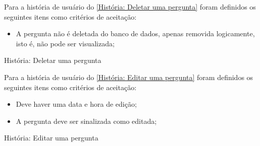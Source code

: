 Para a história de usuário do \autoref{História: Deletar uma pergunta} foram definidos os seguintes itens como critérios de aceitação:

\begin{itemize}
\item A pergunta não é deletada do banco de dados, apenas removida logicamente, isto é, não pode ser visualizada;
\end{itemize}

\def\arraystretch{2}
\begin{quadro}[htb]
\centering
\ABNTEXfontereduzida
\caption[História: Deletar uma pergunta]{História: Deletar uma pergunta}
\label{História: Deletar uma pergunta}
\end{quadro}
\FloatBarrier 

Para a história de usuário do \autoref{História: Editar uma pergunta} foram definidos os seguintes itens como critérios de aceitação:

\begin{itemize}
\item Deve haver uma data e hora de edição;
\item A pergunta deve ser sinalizada como editada;
\end{itemize}

\def\arraystretch{2}
\begin{quadro}[htb]
\centering
\ABNTEXfontereduzida
\caption[História: Editar uma pergunta]{História: Editar uma pergunta}
\label{História: Editar uma pergunta}
\end{quadro}
\FloatBarrier 

